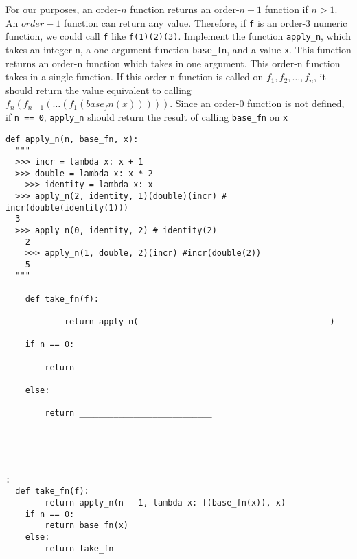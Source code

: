 \begin{blocksection}
\question 
For our purposes, an order-$n$ function returns an order-$n-1$ function if $n > 1$. An $order-1$ function can return any value. 
\newline
Therefore, if \texttt{f} is an order-3 numeric function, we could call \texttt{f} like \lstinline{f(1)(2)(3)}. 
\newline
Implement the function \texttt{apply\_n}, which takes an integer \texttt{n}, a one argument function \texttt{base\_fn},
and a value \texttt{x}. This function returns an order-n function which takes in one argument. This order-n function takes in
a single function. If this order-n function is called on $f_1, f_2, \ldots, f_n$, it should return the value equivalent to calling
$f_n(f_{n - 1}(\ldots (f_1(base_fn(x)))))$. Since an order-0 function is not defined, if \texttt{n == 0}, \texttt{apply\_n} should return the result of calling
\texttt{base\_fn} on \texttt{x}
\begin{lstlisting}
def apply_n(n, base_fn, x): 
  """ 
  >>> incr = lambda x: x + 1
  >>> double = lambda x: x * 2
	>>> identity = lambda x: x
  >>> apply_n(2, identity, 1)(double)(incr) # incr(double(identity(1)))
  3
  >>> apply_n(0, identity, 2) # identity(2)
	2
	>>> apply_n(1, double, 2)(incr) #incr(double(2))
	5
  """
	
	def take_fn(f):
	    
			return apply_n(_______________________________________)
			
	if n == 0:
	
	    return ___________________________
			
	else:
	
	    return ___________________________
	    
			

				
\end{lstlisting}

\begin{solution}[1in]
\begin{lstlisting}:
  def take_fn(f):
	    return apply_n(n - 1, lambda x: f(base_fn(x)), x)
	if n == 0:
	    return base_fn(x)
	else:
	    return take_fn
\end{lstlisting}
\end{solution}
\end{blocksection}
